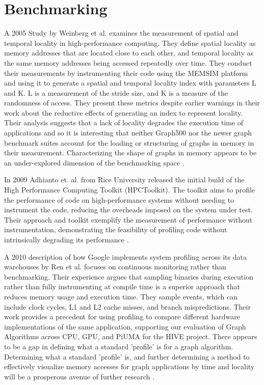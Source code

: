 \section{Benchmarking}

\par{A 2005 Study by Weinberg et al. examines the measurement of spatial and temporal locality in high-performance computing. 
They define spatial locality as memory addresses that are located close to each other, and temporal locality as the same memory addresses being accessed repeatedly over time. 
They conduct their measurements by instrumenting their code using the MEMSIM platform and using it to generate a spatial and temporal locality index with parameters L and K. 
L is a measurement of the stride size, and K is a measure of the randomness of access. 
They present these metrics despite earlier warnings in their work about the reductive effects of generating an index to represent locality. 
Their analysis suggests that a lack of locality degrades the execution time of applications and so it is interesting that neither Graph500 nor the newer graph benchmark suites account for the loading or structuring of graphs in memory in their measurement. 
Characterizing the shape of graphs in memory appears to be an under-explored dimension of the benchmarking space \cite{Weinberg2005}.}

\par{In 2009 Adhianto et. al. from Rice University released the initial build of the High Performance Computing Toolkit (HPCToolkit). 
The toolkit aims to profile the performance of code on high-performance systems without needing to instrument the code, reducing the overheads imposed on the system under test. 
Their approach and toolkit exemplify the measurement of performance without instrumentation, demonstrating the feasibility of profiling code without intrinsically degrading its performance \cite{Adhianto2010}.}

\par{A 2010 description of how Google implements system profiling across its data warehouses by Ren et al. focuses on continuous monitoring rather than benchmarking.  
Their experience argues that sampling binaries during execution rather than fully instrumenting at compile time is a superior approach that reduces memory usage and execution time. 
They sample events, which can include clock cycles, L1 and L2 cache misses, and branch mispredictions. 
Their work provides a precedent for using profiling to compare different hardware implementations of the same application, supporting our evaluation of Graph Algorithms across CPU, GPU, and PiUMA for the HIVE project. 
There appears to be a gap in defining what a standard 'profile' is for a graph algorithm. 
Determining what a standard 'profile' is, and further determining a method to effectively visualize memory accesses for graph applications by time and locality will be a prosperous avenue of further research \cite{Ren2010}.}

